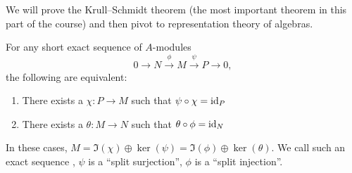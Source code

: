 
\lecture{}

\begin{node}
We will prove the Krull--Schmidt theorem (the most important theorem
in this part of the course) and then pivot to representation theory of
algebras. 
\end{node}

\begin{lemma}\label{lemma:5.7}
For any short exact sequence of $A$-modules
\begin{equation}
0\to N\xrightarrow{\phi}M\xrightarrow{\psi}P\to0,
\end{equation}
the following are equivalent:
\begin{enumerate}
\item There exists a $\chi\colon P\to M$ such that $\psi\circ\chi=\operatorname{id}_{P}$
\item There exists a $\theta\colon M\to N$ such that $\theta\circ\phi=\operatorname{id}_{N}$
\end{enumerate}
In these cases,
$M=\Im(\chi)\oplus\ker(\psi)=\Im(\phi)\oplus\ker(\theta)$. We call such
an exact sequence , $\psi$ is a ``split surjection'',
$\phi$ is a ``split injection''.
\end{lemma}

